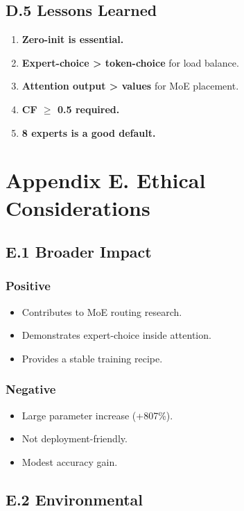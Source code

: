 \subsection{D.5 Lessons Learned}

\begin{enumerate}
\item \textbf{Zero-init is essential.}
\item \textbf{Expert-choice > token-choice} for load balance.
\item \textbf{Attention output > values} for MoE placement.
\item \textbf{CF $\ge$ 0.5 required.}
\item \textbf{8 experts is a good default.}

\end{enumerate}


\section{Appendix E. Ethical Considerations}

\subsection{E.1 Broader Impact}

\subsubsection{Positive}
\begin{itemize}
\item Contributes to MoE routing research.
\item Demonstrates expert-choice inside attention.
\item Provides a stable training recipe.

\end{itemize}
\subsubsection{Negative}
\begin{itemize}
\item Large parameter increase (+807\%).
\item Not deployment-friendly.
\item Modest accuracy gain.

\end{itemize}
\subsection{E.2 Environmental}

